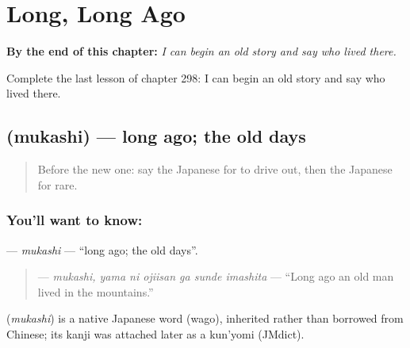 
\chapter{Long, Long Ago}
\label{ch:ja-long-long-ago}

\begin{chapteropening}
\textbf{By the end of this chapter:} \emph{I can begin an old story and say who lived there.}

Complete the last lesson of chapter 298: I can begin an old story and say who lived there.
\end{chapteropening}

\section[\texorpdfstring{\ja{むかし} (mukashi)}{むかし (mukashi)}]{ (mukashi) — long ago; the old days}

\label{lesson:JA-C298-mukashi}



\begin{quote}
Before the new one: say the Japanese for to drive out, then the Japanese for rare.
\end{quote}

\subsection*{You'll want to know: }
\textbf{} — \emph{mukashi} — \textquotedblleft{}long ago; the old days\textquotedblright{}.

\begin{quote}
\textbf{  } — \emph{mukashi, yama ni ojiisan ga sunde imashita} — \textquotedblleft{}Long ago an old man lived in the mountains.\textquotedblright{}
\end{quote}

\begin{cousinweb}
\textbf{} (\emph{mukashi}) is a native Japanese word (wago), inherited rather than borrowed from Chinese; its kanji was attached later as a kun'yomi (JMdict).
\end{cousinweb}

